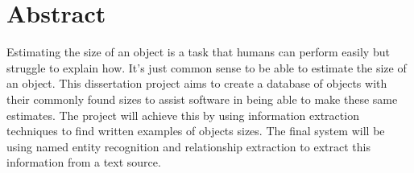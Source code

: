 \chapter*{\Large \center Abstract}

Estimating the size of an object is a task that humans can perform easily but struggle to explain how. It's just common sense to be able to estimate the size of an object. This dissertation project aims to create a database of objects with their commonly found sizes to assist software in being able to make these same estimates. The project will achieve this by using information extraction techniques to find written examples of objects sizes. The final system will be using named entity recognition and relationship extraction to extract this information from a text source.
